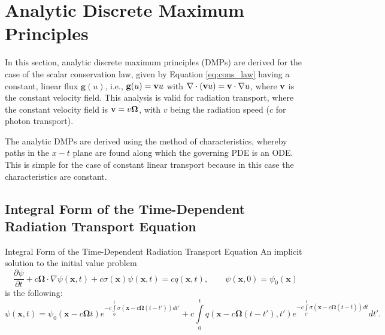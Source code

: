 \section{Analytic Discrete Maximum Principles}
In this section, analytic discrete maximum principles (DMPs) are derived
for the case of the scalar conservation law, given by Equation
\eqref{eq:cons_law} having a constant, linear flux $\mathbf{g}(u)$, i.e.,
$\mathbf{g}(u) = \mathbf{v} u$ with $\nabla\cdot(\mathbf{v} u) = \mathbf{v}\cdot\nabla u$,
where $\mathbf{v}$ is the constant velocity field. This analysis is valid for
radiation transport, where the constant velocity field is $\mathbf{v}=v\mathbf{\Omega}$, with
$v$ being the radiation speed ($c$ for photon transport).

The analytic DMPs are derived using the method of characteristics, whereby
paths in the $x-t$ plane are found along which the governing PDE is an ODE.
This is simple for the case of constant linear transport because in this case
the characteristics are constant.

\subsection{Integral Form of the Time-Dependent Radiation Transport Equation}
\begin{theorem}{Integral Form of the Time-Dependent Radiation Transport Equation}
   An implicit solution to the initial value problem
   \begin{equation}\label{PDE}
      \frac{\partial \psi}{\partial t} + c\mathbf{\Omega}\cdot\nabla\psi(\mathbf{x},t)
      + c\sigma(\mathbf{x})\psi(\mathbf{x},t) = c q(\mathbf{x},t),
      \qquad \psi(\mathbf{x},0) = \psi_0(\mathbf{x})
   \end{equation}
   is the following:
   \begin{equation}\label{exact}
      \psi(\mathbf{x},t) = \psi_0(\mathbf{x} - c\mathbf{\Omega}t)
         e^{-c\int\limits_0^t \sigma(\mathbf{x} - c\mathbf{\Omega}(t -t'))dt'} +
         c \int\limits_0^t q(\mathbf{x} - c\mathbf{\Omega}(t -t'),t')
         e^{-c\int\limits_{t'}^t\sigma(\mathbf{x}
         - c\mathbf{\Omega}(t -\bar{t}))d\bar{t}} dt'.
   \end{equation}
\end{theorem}

